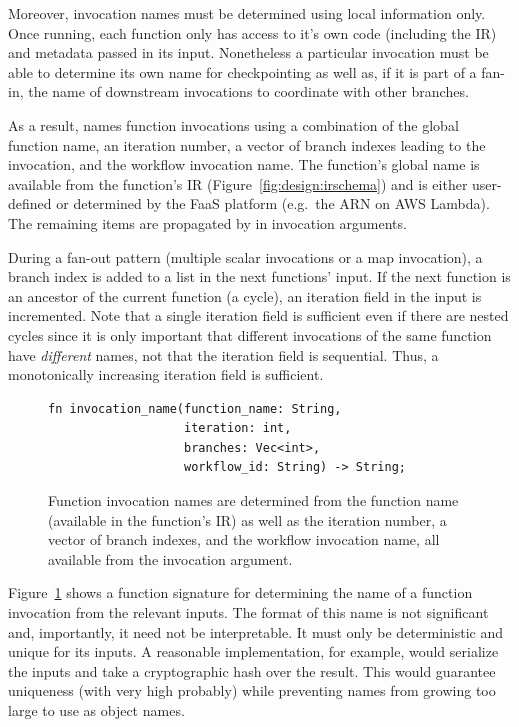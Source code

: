 Moreover, invocation names must be determined using local information only. Once
running, each function only has access to it's own code (including the IR) and
metadata passed in its input. Nonetheless a particular invocation must be able
to determine its own name for checkpointing as well as, if it is part of a
fan-in, the name of downstream invocations to coordinate with other branches.

As a result, \name{} names function invocations using a combination of the
global function name, an iteration number, a vector of branch indexes leading to
the invocation, and the workflow invocation name. The function's global name is
available from the function's IR (Figure~\ref{fig:design:irschema}) and is
either user-defined or determined by the FaaS platform (e.g.\ the ARN on AWS
Lambda). The remaining items are propagated by \name{} in invocation arguments.

During a fan-out pattern (multiple scalar invocations or a map invocation), a
branch index is added to a list in the next functions' input. If the next
function is an ancestor of the current function (a cycle), an iteration field in
the input is incremented. Note that a single iteration field is sufficient even
if there are nested cycles since it is only important that different invocations
of the same function have \emph{different} names, not that the iteration field
is sequential. Thus, a monotonically increasing iteration field is sufficient.

\begin{figure}
\begin{verbatim}
fn invocation_name(function_name: String,
                   iteration: int,
                   branches: Vec<int>,
                   workflow_id: String) -> String;
\end{verbatim}
\label{fig:design:names}
\caption{Function invocation names are determined from the function name
(available in the function's IR) as well as the iteration number, a vector of
branch indexes, and the workflow invocation name, all available from the
invocation argument.}
\end{figure}

Figure~\ref{fig:design:names} shows a function signature for determining the name of a
function invocation from the relevant inputs. The format of this name is not
significant and, importantly, it need not be interpretable. It must only be
deterministic and unique for its inputs. A reasonable implementation, for
example, would serialize the inputs and take a cryptographic hash over the
result. This would guarantee uniqueness (with very high probably) while
preventing names from growing too large to use as object names.
